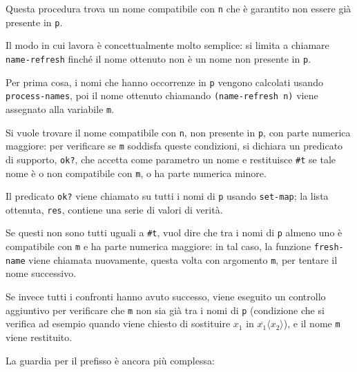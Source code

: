 Questa procedura trova un nome compatibile con \lstinline{n} che \`e
garantito non essere gi\`a presente in \lstinline{p}.

Il modo in cui lavora \`e concettualmente molto semplice: si limita a
chiamare \lstinline{name-refresh} finch\'e il nome ottenuto non \`e
un nome non presente in \lstinline{p}.

Per prima cosa, i nomi che hanno occorrenze in \lstinline{p} vengono
calcolati usando \lstinline{process-names}, poi il nome ottenuto chiamando
\lstinline{(name-refresh n)} viene assegnato alla variabile \lstinline{m}.

Si vuole trovare il nome compatibile con \lstinline{n}, non presente in
\lstinline{p}, con parte numerica maggiore: per verificare se
\lstinline{m} soddisfa queste condizioni, si dichiara un predicato di
supporto, \lstinline{ok?}, che accetta come parametro un nome e restituisce
\lstinline{#t} se tale nome \`e o non compatibile con \lstinline{m}, o ha
parte numerica minore.

Il predicato \lstinline{ok?} viene chiamato su tutti i nomi di \lstinline{p}
usando \lstinline{set-map}; la lista ottenuta, \lstinline{res}, contiene
una serie di valori di verit\`a.

Se questi non sono tutti uguali a \lstinline{#t}, vuol dire che tra i nomi
di \lstinline{p} almeno uno \`e compatibile con \lstinline{m} e ha parte
numerica maggiore: in tal caso, la funzione \lstinline{fresh-name} viene
chiamata nuovamente, questa volta con argomento \lstinline{m}, per tentare
il nome successivo.

Se invece tutti i confronti hanno avuto successo, viene eseguito un
controllo aggiuntivo per verificare che \lstinline{m} non sia gi\`a tra
i nomi di \lstinline{p} (condizione che si verifica ad esempio quando viene
chiesto di sostituire $x_1$ in $\overline{x_1}\langle x_2\rangle$), e il
nome \lstinline{m} viene restituito.

La guardia per il prefisso \`e ancora pi\`u complessa:

